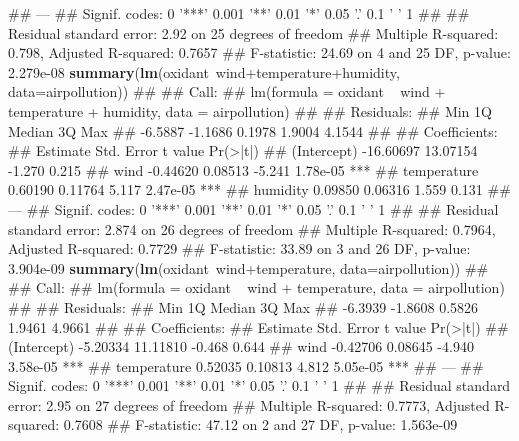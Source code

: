 \documentclass[11pt,]{article}
\newenvironment{Shaded}{\begin{snugshade}}{\end{snugshade}}
\newcommand{\KeywordTok}[1]{\textcolor[rgb]{0.13,0.29,0.53}{\textbf{{#1}}}}
\newcommand{\DataTypeTok}[1]{\textcolor[rgb]{0.13,0.29,0.53}{{#1}}}
\newcommand{\NormalTok}[1]{{#1}}
\begin{document}
\begin{Shaded}
\begin{Highlighting}[]
\NormalTok{## ---}
\NormalTok{## Signif. codes:  0 '***' 0.001 '**' 0.01 '*' 0.05 '.' 0.1 ' ' 1}
\NormalTok{## }
\NormalTok{## Residual standard error: 2.92 on 25 degrees of freedom}
\NormalTok{## Multiple R-squared:  0.798,  Adjusted R-squared:  0.7657 }
\NormalTok{## F-statistic: 24.69 on 4 and 25 DF,  p-value: 2.279e-08}
\KeywordTok{summary}\NormalTok{(}\KeywordTok{lm}\NormalTok{(oxidant~wind+temperature+humidity, }\DataTypeTok{data=}\NormalTok{airpollution))}
\NormalTok{## }
\NormalTok{## Call:}
\NormalTok{## lm(formula = oxidant ~ wind + temperature + humidity, data = airpollution)}
\NormalTok{## }
\NormalTok{## Residuals:}
\NormalTok{##     Min      1Q  Median      3Q     Max }
\NormalTok{## -6.5887 -1.1686  0.1978  1.9004  4.1544 }
\NormalTok{## }
\NormalTok{## Coefficients:}
\NormalTok{##              Estimate Std. Error t value Pr(>|t|)    }
\NormalTok{## (Intercept) -16.60697   13.07154  -1.270    0.215    }
\NormalTok{## wind         -0.44620    0.08513  -5.241 1.78e-05 ***}
\NormalTok{## temperature   0.60190    0.11764   5.117 2.47e-05 ***}
\NormalTok{## humidity      0.09850    0.06316   1.559    0.131    }
\NormalTok{## ---}
\NormalTok{## Signif. codes:  0 '***' 0.001 '**' 0.01 '*' 0.05 '.' 0.1 ' ' 1}
\NormalTok{## }
\NormalTok{## Residual standard error: 2.874 on 26 degrees of freedom}
\NormalTok{## Multiple R-squared:  0.7964, Adjusted R-squared:  0.7729 }
\NormalTok{## F-statistic: 33.89 on 3 and 26 DF,  p-value: 3.904e-09}
\KeywordTok{summary}\NormalTok{(}\KeywordTok{lm}\NormalTok{(oxidant~wind+temperature, }\DataTypeTok{data=}\NormalTok{airpollution))}
\NormalTok{## }
\NormalTok{## Call:}
\NormalTok{## lm(formula = oxidant ~ wind + temperature, data = airpollution)}
\NormalTok{## }
\NormalTok{## Residuals:}
\NormalTok{##     Min      1Q  Median      3Q     Max }
\NormalTok{## -6.3939 -1.8608  0.5826  1.9461  4.9661 }
\NormalTok{## }
\NormalTok{## Coefficients:}
\NormalTok{##             Estimate Std. Error t value Pr(>|t|)    }
\NormalTok{## (Intercept) -5.20334   11.11810  -0.468    0.644    }
\NormalTok{## wind        -0.42706    0.08645  -4.940 3.58e-05 ***}
\NormalTok{## temperature  0.52035    0.10813   4.812 5.05e-05 ***}
\NormalTok{## ---}
\NormalTok{## Signif. codes:  0 '***' 0.001 '**' 0.01 '*' 0.05 '.' 0.1 ' ' 1}
\NormalTok{## }
\NormalTok{## Residual standard error: 2.95 on 27 degrees of freedom}
\NormalTok{## Multiple R-squared:  0.7773, Adjusted R-squared:  0.7608 }
\NormalTok{## F-statistic: 47.12 on 2 and 27 DF,  p-value: 1.563e-09}
\end{Highlighting}
\end{Shaded}
\end{document}
